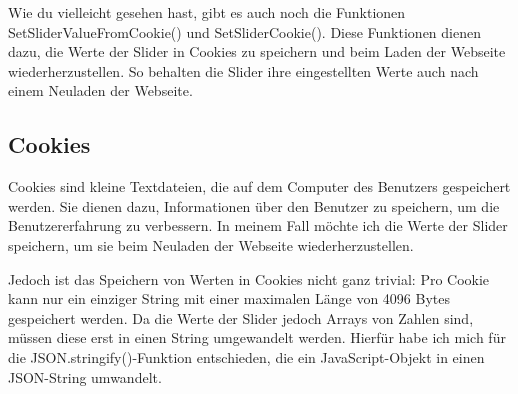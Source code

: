 Wie du vielleicht gesehen hast, gibt es auch noch die Funktionen SetSliderValueFromCookie() und SetSliderCookie(). Diese Funktionen dienen dazu, die Werte der Slider in Cookies zu speichern und beim Laden der Webseite wiederherzustellen. So behalten die Slider ihre eingestellten Werte auch nach einem Neuladen der Webseite.

\subsection{Cookies}

Cookies sind kleine Textdateien, die auf dem Computer des Benutzers gespeichert werden. Sie dienen dazu, Informationen über den Benutzer zu speichern, um die Benutzererfahrung zu verbessern. In meinem Fall möchte ich die Werte der Slider speichern, um sie beim Neuladen der Webseite wiederherzustellen.

Jedoch ist das Speichern von Werten in Cookies nicht ganz trivial: Pro Cookie kann nur ein einziger String mit einer maximalen Länge von 4096 Bytes gespeichert werden. Da die Werte der Slider jedoch Arrays von Zahlen sind, müssen diese erst in einen String umgewandelt werden. Hierfür habe ich mich für die JSON.stringify()-Funktion entschieden, die ein JavaScript-Objekt in einen JSON-String umwandelt.
